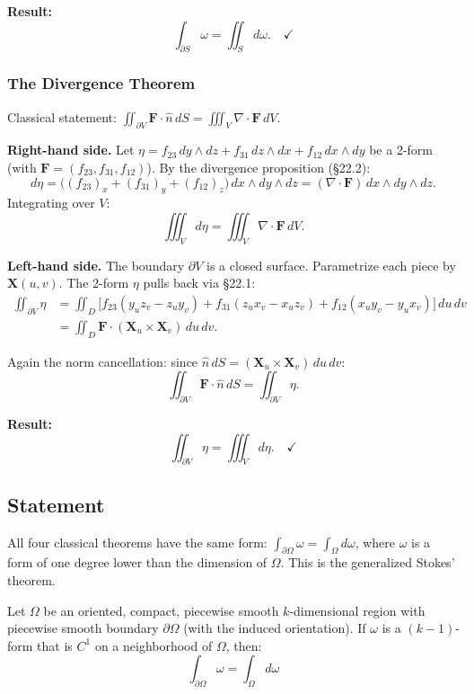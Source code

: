 \documentclass[11pt]{report}
\begin{document}
\textbf{Result:}
\[
\int_{\partial S} \omega = \iint_S d\omega. \quad \checkmark
\]

\subsubsection*{The Divergence Theorem}

Classical statement: $\iint_{\partial V} \mathbf{F} \cdot \hat{n}\,dS = \iiint_V \nabla \cdot \mathbf{F}\,dV$.

\textbf{Right-hand side.} Let $\eta = f_{23}\,dy \wedge dz + f_{31}\,dz \wedge dx + f_{12}\,dx \wedge dy$ be a 2-form (with $\mathbf{F} = (f_{23}, f_{31}, f_{12})$). By the divergence proposition (\S22.2):
\[
d\eta = \big((f_{23})_x + (f_{31})_y + (f_{12})_z\big)\,dx \wedge dy \wedge dz = (\nabla \cdot \mathbf{F})\,dx \wedge dy \wedge dz.
\]
Integrating over $V$:
\[
\iiint_V d\eta = \iiint_V \nabla \cdot \mathbf{F}\,dV.
\]

\textbf{Left-hand side.} The boundary $\partial V$ is a closed surface. Parametrize each piece by $\mathbf{X}(u,v)$. The 2-form $\eta$ pulls back via \S22.1:
\begin{align*}
\iint_{\partial V} \eta &= \iint_D \big[f_{23}(y_u z_v - z_u y_v) + f_{31}(z_u x_v - x_u z_v) + f_{12}(x_u y_v - y_u x_v)\big]\,du\,dv \\
&= \iint_D \mathbf{F} \cdot (\mathbf{X}_u \times \mathbf{X}_v)\,du\,dv.
\end{align*}

Again the norm cancellation: since $\hat{n}\,dS = (\mathbf{X}_u \times \mathbf{X}_v)\,du\,dv$:
\[
\iint_{\partial V} \mathbf{F} \cdot \hat{n}\,dS = \iint_{\partial V} \eta.
\]

\textbf{Result:}
\[
\iint_{\partial V} \eta = \iiint_V d\eta. \quad \checkmark
\]

\subsection{Statement}

All four classical theorems have the same form: $\int_{\partial \Omega} \omega = \int_\Omega d\omega$, where $\omega$ is a form of one degree lower than the dimension of $\Omega$. This is the generalized Stokes' theorem.

\begin{theorem}
Let $\Omega$ be an oriented, compact, piecewise smooth $k$-dimensional region with piecewise smooth boundary $\partial \Omega$ (with the induced orientation). If $\omega$ is a $(k-1)$-form that is $C^1$ on a neighborhood of $\Omega$, then:
\[
\boxed{\int_{\partial \Omega} \omega = \int_\Omega d\omega}
\]
\end{theorem}
\end{document}
